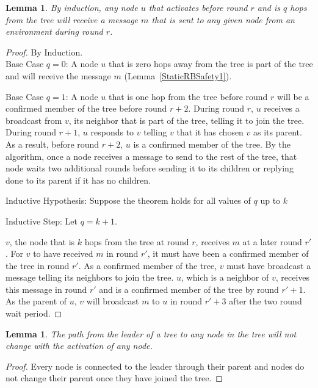 \documentclass[english]{article}
\newtheorem{lemma}[theorem]{Lemma}
\begin{document}
\begin{lemma}
\label{RBSafety1ByInduction}
  By induction, any node $u$ that activates before round $r$ and is $q$ hops from the tree will receive a message $m$ that is sent to any given node from an environment during round $r$.
\end{lemma}
\begin{proof} By Induction. \\

\noindent Base Case $q=0$: A node $u$ that is zero hops away from the tree is part of the tree and will receive the message $m$ (Lemma~\ref{StaticRBSafety1}).

\noindent Base Case $q=1$: A node $u$ that is one hop from the tree before round $r$ will be a confirmed member of the tree before round $r+2$. During round $r$, $u$ receives a broadcast from $v$, its neighbor that is part of the tree, telling it to join the tree. During round $r+1$, $u$ responds to $v$ telling $v$ that it has chosen $v$ as its parent. As a result, before round $r+2$, $u$ is a confirmed member of the tree. By the algorithm, once a node receives a message to send to the rest of the tree, that node waits two additional rounds before sending it to its children or replying done to its parent if it has no children. 

\noindent Inductive Hypothesis: Suppose the theorem holds for all values of $q$ up to $k$

\noindent Inductive Step: Let $q=k+1$.

$v$, the node that is $k$ hops from the tree at round $r$, receives $m$ at a later round $r'$. For $v$ to have received $m$ in round $r'$, it must have been a confirmed member of the tree in round $r'$. As a confirmed member of the tree, $v$ must have broadcast a message telling its neighbors to join the tree. $u$, which is a neighbor of $v$, receives this message in round $r'$ and is a confirmed member of the tree by round $r'+1$. As the parent of $u$, $v$ will broadcast $m$ to $u$ in round $r'+3$ after the two round wait period.
\end{proof}

\begin{lemma}
\label{StablePath}
The path from the leader of a tree to any node in the tree will not change with the activation of any node.
\end{lemma}
\begin{proof}
Every node is connected to the leader through their parent and nodes do not change their parent once they have joined the tree.
\end{proof}
\end{document}
